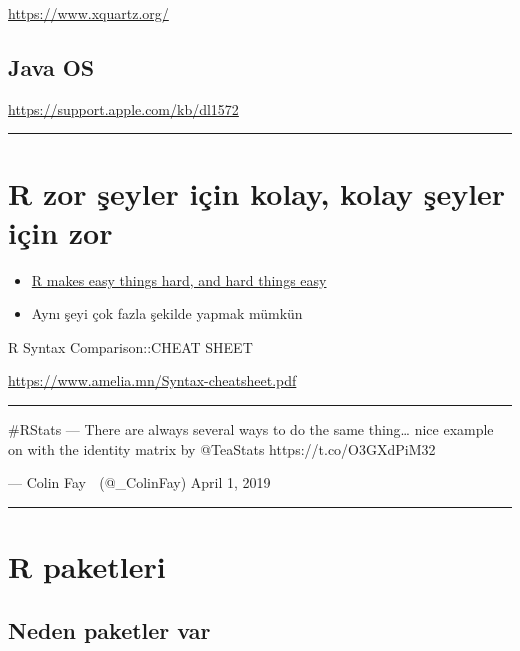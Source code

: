 \documentclass[]{article}
\begin{document}
\url{https://www.xquartz.org/}

\hypertarget{java-os}{%
\subsection{Java OS}\label{java-os}}

\url{https://support.apple.com/kb/dl1572}

\begin{center}\rule{0.5\linewidth}{\linethickness}\end{center}

\hypertarget{r-zor-seyler-icin-kolay-kolay-seyler-icin-zor}{%
\section{R zor şeyler için kolay, kolay şeyler için
zor}\label{r-zor-seyler-icin-kolay-kolay-seyler-icin-zor}}

\begin{itemize}
\item
  \href{http://r4stats.com/articles/why-r-is-hard-to-learn/}{R makes
  easy things hard, and hard things easy}
\item
  Aynı şeyi çok fazla şekilde yapmak mümkün
\end{itemize}

R Syntax Comparison::CHEAT SHEET

\url{https://www.amelia.mn/Syntax-cheatsheet.pdf}

\begin{center}\rule{0.5\linewidth}{\linethickness}\end{center}

\#RStats --- There are always several ways to do the same thing\ldots{}
nice example on with the identity matrix by @TeaStats
https://t.co/O3GXdPiM32

--- Colin Fay 🤘 (@\_ColinFay) April 1, 2019

\begin{center}\rule{0.5\linewidth}{\linethickness}\end{center}

\hypertarget{r-paketleri}{%
\section{R paketleri}\label{r-paketleri}}

\hypertarget{neden-paketler-var}{%
\subsection{Neden paketler var}\label{neden-paketler-var}}
\end{document}
